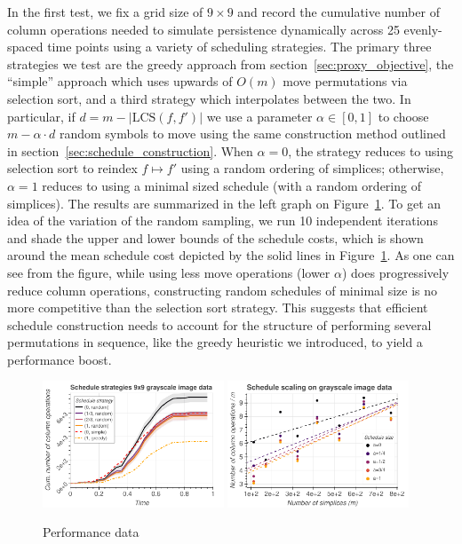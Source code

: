 \documentclass[sn-mathphys]{sn-jnl}
\begin{document}
 In the first test, we fix a grid size of $9 \times 9$ and record the cumulative number of column operations needed to simulate persistence dynamically across 25 evenly-spaced time points using a variety of scheduling strategies.
 The primary three strategies we test are the greedy approach from section~\ref{sec:proxy_objective}, the ``simple'' approach which uses upwards of $O(m)$ move permutations via selection sort, and a third strategy which interpolates between the two. 
 In particular, if $d = m - \lvert \mathrm{LCS}(f, f') \rvert$ we use a parameter $\alpha \in [0,1]$ to choose $m - \alpha \cdot d$ random symbols to move using the same construction method outlined in section~\ref{sec:schedule_construction}. When $\alpha = 0$, the strategy reduces to using selection sort to reindex $f \mapsto f'$ using a random ordering of simplices; otherwise, $\alpha = 1$ reduces to using a minimal sized schedule (with a random ordering of simplices). The results are summarized in the left graph on Figure~\ref{fig:movie_perf}. To get an idea of the variation of the random sampling, we run 10 independent iterations and shade the upper and lower bounds of the schedule costs, which is shown around the mean schedule cost depicted by the solid lines in Figure~\ref{fig:movie_perf}. 
 As one can see from the figure, while using less move operations (lower $\alpha$) does progressively reduce column operations, constructing random schedules of minimal size is no more competitive than the selection sort strategy. This suggests that efficient schedule construction needs to account for the structure of performing several permutations in sequence, like the greedy heuristic we introduced, to yield a performance boost. 

\begin{figure}
	\centering
	\includegraphics[width=0.48\textwidth]{varying_d.pdf}
	\includegraphics[width=0.48\textwidth]{varying_nd.pdf}
	\caption{Performance data }
	\label{fig:movie_perf}
\end{figure}
\end{document}
